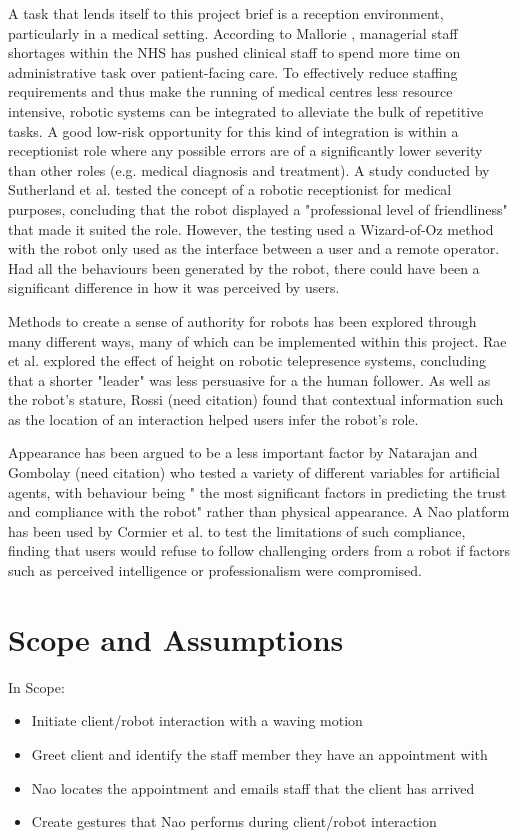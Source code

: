 \documentclass[conference]{IEEEtran}
\begin{document}
A task that lends itself to this project brief is a reception environment, particularly in a medical setting. According to 
Mallorie \cite{mallorie2024}, managerial staff shortages within the NHS has pushed clinical staff to spend more time on administrative task over 
patient-facing care. To effectively reduce staffing requirements and thus make the running of medical centres less resource intensive, robotic 
systems can be integrated to alleviate the bulk of repetitive tasks. A good low-risk opportunity for this kind of integration is within a 
receptionist role where any possible errors are of a significantly lower severity than other roles (e.g. medical diagnosis and treatment).
A study conducted by Sutherland et al. \cite{Sutherland2019} tested the concept of a robotic receptionist for medical purposes, concluding that the robot displayed a 
"professional level of friendliness" that made it suited the role. However, the testing used a Wizard-of-Oz method with the robot only 
used as the interface between a user and a remote operator. Had all the behaviours been generated by the robot, there could have been 
a significant difference in how it was perceived by users.

Methods to create a sense of authority for robots has been explored through many different ways, many of which can be implemented within 
this project. Rae et al. \cite{Rae2013} explored the effect of height on robotic telepresence systems, concluding that a shorter "leader" was less persuasive 
for a the human follower. As well as the robot's stature, Rossi (need citation) found that contextual information such as the location of an interaction 
helped users infer the robot’s role.

Appearance has been argued to be a less important factor by Natarajan and Gombolay (need citation) who tested a variety of different variables for artificial agents, with 
behaviour being " the most significant factors in predicting the trust and compliance with the robot" rather 
than physical appearance. A Nao platform has been used by Cormier et al. \cite{cormier2013} to test the limitations of such compliance, finding that users would 
refuse to follow challenging orders from a robot if factors such as perceived intelligence or professionalism were compromised.

\section{Scope and Assumptions} In Scope:
\begin{itemize}
        \item Initiate client/robot interaction with a waving motion
        \item Greet client and identify the staff member they have an appointment with
        \item Nao locates the appointment and emails staff that the client has arrived
        \item Create gestures that Nao performs during client/robot interaction    
\end{itemize}
\end{document}
